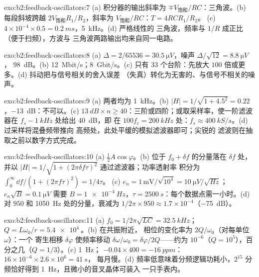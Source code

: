 \begin{solution}{exo:b2:feedback-oscillators:7}
(a) 积分器的输出斜率为 $\mp V_{\text{饱和}}/RC$：三角波。(b)
每段斜坡跨越 $2V_{\text{饱和}}R_1/R_2$，斜率为 $V_{\text{饱和}}/RC$：$T = 4RCR_1/R_2$。
(c) $4 \times 10^{-4} \times 0.5 = \qty{0.2}{ms}$，\qty{5}{kHz}。(d) 严格线性的
三角波，频率与 $1/R$ 成正比（便于扫频），方波与
三角波两路输出均来自同一电路。
\end{solution}

\begin{solution}{exo:b2:feedback-oscillators:8}
(a) $\Delta = 2/65536 = \qty{30.5}{\micro V}$，噪声 $\Delta/\sqrt{12} = \qty{8.8}{\micro V}$，
\qty{98}{dB}。(b) \qty{12}{Mbit/s}；\qty{8}{Gbit/s}。(c) 只有 $33$ 个台阶：先放大
$100$ 倍或更多。(d) 抖动把与信号相关的舍入误差
（失真）转化为无害的、与信号不相关的噪声。
\end{solution}

\begin{solution}{exo:b2:feedback-oscillators:9}
(a) 两者均为 \qty{1}{kHz}。(b) $|H| = 1/\sqrt{1 + 4.5^2} = 0.22$，\qty{-13}{dB}：不可以。(c)
$\qty{13}{dB} \times n \ge 40$：三阶或四阶；或取采样率，使一阶滤波器在
$f_s - \qty{1}{kHz}$ 处给出 \qty{40}{dB}，即
在 $100f_c = \qty{200}{kHz}$ 处：$f_s \approx \qty{400}{kS/s}$。(d) 过采样将混叠频带推向
高频处，此处平缓的模拟滤波器即可；尖锐的
滤波则在抽取之前以数字方式完成。
\end{solution}

\begin{solution}{exo:b2:feedback-oscillators:10}
(a) $\tfrac12A\cos\varphi$。(b) 位于 $f_0 + \delta f$ 的分量落在 $\delta f$ 处，
并以 $|H| = 1/\sqrt{1 + (2\pi\delta f\tau)^2}$ 通过滤波器；功率透射率
积分为 $\int_0^\infty\dd f/(1 + (2\pi f\tau)^2) = 1/4\tau$。
(c) $e_n = 1\,\text{mV}/\sqrt{10^4} = \qty{10}{\micro V/\sqrt{Hz}}$；$e_n\sqrt B = \qty{0.1}{\micro V}$
需要 $B = \qty{1e-4}{Hz}$，$\tau = \qty{2500}{s}$：每个数据点需一小时。(d) 对 $950$
和 \qty{1050}{Hz} 处的分量，衰减为 $1/2\pi \times 950 \approx 1.7 \times 10^{-4}$（\qty{-75}{dB}）。
\end{solution}

\begin{solution}{exo:b2:feedback-oscillators:11}
(a) $f_0 = 1/2\pi\sqrt{LC} = \qty{32.5}{kHz}$；$Q = L\omega_0/r = \qty{5.4e4}{}$。(b) 在共振附近，
相位的变化率为 $2Q/\omega_0$（对每单位 $\omega$）：一个
寄生相移 $\delta\varphi$ 使频率移动 $\delta\omega/\omega_0 =
\delta\varphi/2Q$——约为 $10^{-6}$（$Q = 10^5$），百分之几（$Q = 1/3$）。(c) \qty{1}{Hz}；
$-0.04 \times 400 = \qty{-16}{ppm}$：$16 \times 10^{-6} \times 2.6 \times 10^6 = \qty{41}{s}$，
每月慢。(d) 频率低意味着分频逻辑功耗小，$2^{15}$
分频恰好得到 \qty{1}{Hz}，且微小的音叉晶体可装入
一只手表内。
\end{solution}

